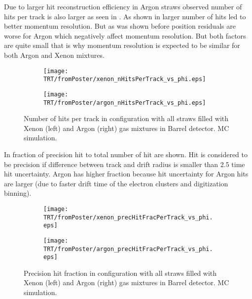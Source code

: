 
Due to larger hit reconstruction efficiency in Argon straws observed number of hits per track is also larger as seen in . 
As shown in  larger number of hits led to better momentum resolution. But as was shown before position residuals are
worse for Argon which negatively affect momentum resolution. But both factors are quite small that is why momentum resolution is expected to be similar for
both Argon and Xenon mixtures.

\begin{figure}

\begin{subfigure}{.5\textwidth}
  \centering
  \texttt{[image: TRT/fromPoster/xenon\_nHitsPerTrack\_vs\_phi.eps]}
\end{subfigure}%
\begin{subfigure}{.5\textwidth}
  \centering
  \texttt{[image: TRT/fromPoster/argon\_nHitsPerTrack\_vs\_phi.eps]}
\end{subfigure}

\caption{Number of hits per track in configuration with all straws filled with Xenon (left) and Argon (right) gas mixtures in Barrel detector. MC simulation.}
  \label{fig:nHitsPerTrack}
\end{figure}

In  fraction of precision hit to total number of hit are shown. Hit is considered to be precision
if difference between track and drift radius is smaller than 2.5 time hit uncertainty. Argon has higher fraction because hit uncertainty
for Argon hits are larger (due to faster drift time of the electron clusters and digitization binning). 

\begin{figure}

\begin{subfigure}{.5\textwidth}
  \centering
  \texttt{[image: TRT/fromPoster/xenon\_precHitFracPerTrack\_vs\_phi.eps]}
\end{subfigure}%
\begin{subfigure}{.5\textwidth}
  \centering
  \texttt{[image: TRT/fromPoster/argon\_precHitFracPerTrack\_vs\_phi.eps]}
\end{subfigure}

\caption{Precision hit fraction in configuration with all straws filled with Xenon (left) and Argon (right) gas mixtures in Barrel detector. MC simulation.}
  \label{fig:precHitFracPerTrack}
\end{figure}


